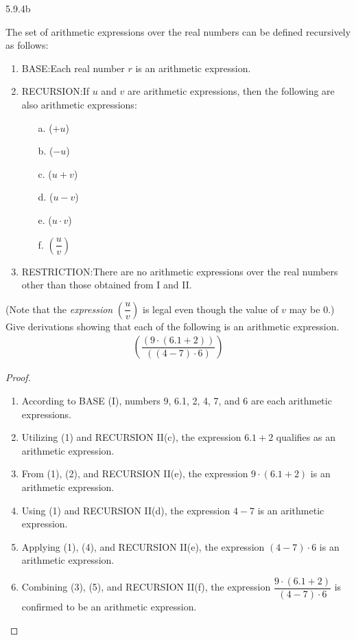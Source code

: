 \begin{question}
    {5.9.4b}
    {
        The set of arithmetic expressions over the real numbers can be defined recursively as follows:
        \vspace{-\baselineskip}
        \begin{enumerate}[label=\Roman*.]
            \item BASE:\@ Each real number $r$ is an arithmetic expression.
            \item RECURSION:\@ If $u$ and $v$ are arithmetic expressions, then the following are also arithmetic expressions:
                \begin{enumerate}
                    \item[a.] ($+u$)
                    \item[b.] ($-u$)
                    \item[c.] ($u + v$)
                    \item[d.] ($u - v$)
                    \item[e.] ($u \cdot v$)
                    \item[f.] $\left(\dfrac{u}{v} \right)$
                \end{enumerate}
            \item RESTRICTION:\@ There are no arithmetic expressions over the real numbers other than those obtained from I and II.\@
        \end{enumerate}
        \vspace{-\baselineskip}
        (Note that the \textit{expression} $\left(\dfrac{u}{v} \right)$ is legal even though the value of $v$ may be $0$.) Give derivations showing that each of the following is an arithmetic expression.
        \begin{align*}
            \left(\dfrac{(9 \cdot (6.1 + 2))}{((4-7) \cdot 6)} \right)
        \end{align*}
    }
\end{question}
\begin{proof}
    \begin{enumerate}
        \item According to BASE (I), numbers 9, 6.1, 2, 4, 7, and 6 are each arithmetic expressions.
        \item Utilizing (1) and RECURSION II(c), the expression \(6.1 + 2\) qualifies as an arithmetic expression.
        \item From (1), (2), and RECURSION II(e), the expression \(9 \cdot (6.1 + 2)\) is an arithmetic expression.
        \item Using (1) and RECURSION II(d), the expression \(4 - 7\) is an arithmetic expression.
        \item Applying (1), (4), and RECURSION II(e), the expression \((4 - 7) \cdot 6\) is an arithmetic expression.
        \item Combining (3), (5), and RECURSION II(f), the expression \(\dfrac{9 \cdot (6.1 + 2)}{(4 - 7) \cdot 6}\) is confirmed to be an arithmetic expression.
    \end{enumerate}
    \vspace{-\baselineskip}
\end{proof}

